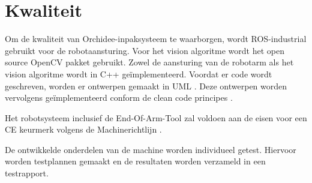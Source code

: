 \section{Kwaliteit}

Om de kwaliteit van Orchidee-inpaksysteem te waarborgen, wordt ROS-industrial gebruikt voor de robotaansturing.
Voor het vision algoritme wordt het open source OpenCV pakket gebruikt.
Zowel de aansturing van de robotarm als het vision algoritme wordt in C++ geïmplementeerd.
Voordat er code wordt geschreven, worden er ontwerpen gemaakt in UML \cite{UML}.
Deze ontwerpen worden vervolgens geïmplementeerd conform de clean code principes \cite{CLEAN_CODE}.

Het robotsysteem inclusief de End-Of-Arm-Tool zal voldoen aan de eisen voor een CE keurmerk volgens de Machinerichtlijn \cite{Machinerichtlijn}.

De ontwikkelde onderdelen van de machine worden individueel getest. Hiervoor worden testplannen gemaakt en de resultaten worden verzameld in een testrapport.

\newpage